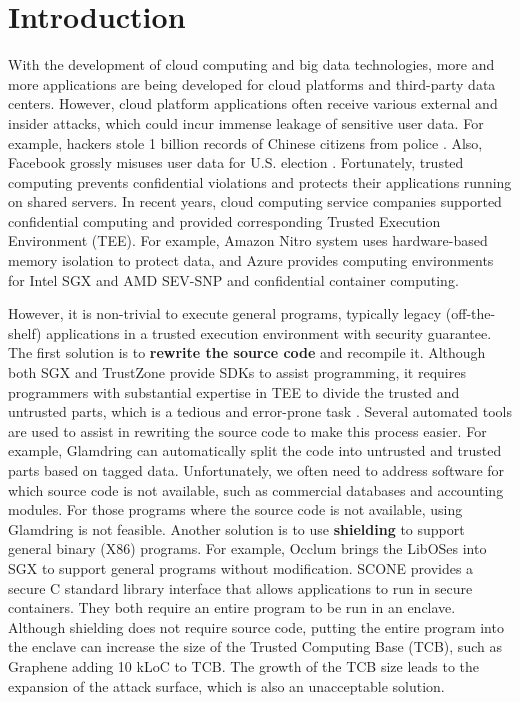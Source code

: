 \section{Introduction}
With the development of cloud computing and big data technologies,
more and more applications are being developed for cloud platforms
and third-party data centers. However, cloud platform applications
often receive various external and insider attacks, which could
incur immense leakage of sensitive user data.
For example, hackers stole 1 billion records of Chinese citizens from police \cite{ChinaHackPolice}.
Also, Facebook grossly misuses user data for U.S. election \cite{Facebook}.
Fortunately, trusted computing prevents confidential violations and
protects their applications running on shared servers.
In recent years, cloud computing service companies supported confidential
computing and provided corresponding Trusted Execution Environment (TEE).
For example, Amazon Nitro system \cite{AmazonNitro} uses hardware-based memory
isolation to protect data, and Azure \cite{AzureDocs} provides computing environments
for Intel SGX and AMD SEV-SNP and confidential container computing.

However, it is non-trivial to execute general programs, typically legacy (off-the-shelf)
applications in a trusted execution environment with security guarantee.
The first solution is to \textbf{rewrite the source code} and recompile it.
Although both SGX and TrustZone provide SDKs to assist programming, it requires
programmers with substantial expertise in TEE to divide the trusted and untrusted parts,
which is a tedious and error-prone task \cite{dong2021research}. Several automated tools
are used to assist in rewriting the source code to make this process easier.
For example, Glamdring \cite{Lind2017GlamdringAA} can automatically
split the code into untrusted and trusted parts based on tagged data.
Unfortunately, we often need to address software for which source code is not available,
such as commercial databases and accounting modules. For those programs where the
source code is not available, using Glamdring is not feasible.
Another solution is to use \textbf{shielding} to support general binary (X86) programs.
For example, Occlum \cite{Shen2020OcclumSA} brings the LibOSes
into SGX to support general programs without modification. SCONE \cite{Arnautov2016SCONESL}
provides a secure C standard library interface that allows applications to
run in secure containers. They both require an entire program to be run in an enclave.
Although shielding does not require source code,
putting the entire program into the enclave can increase the size of the
Trusted Computing Base (TCB), such as Graphene \cite{Tsai2017GrapheneSGXAP}
adding 10 kLoC to TCB.
The growth of the TCB size leads to the expansion of the attack surface,
which is also an unacceptable solution.

